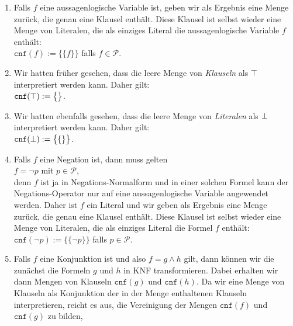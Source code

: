 \begin{enumerate}
\item Falls $f$ eine aussagenlogische Variable ist, geben wir als Ergebnis eine Menge zurück, die genau eine
      Klausel enthält.  Diese Klausel ist selbst wieder eine Menge von Literalen, die als einziges Literal die
      aussagenlogische Variable $f$ enthält:
      \\[0.2cm]
      \hspace*{1.3cm}
      $\texttt{cnf}(f) := \bigl\{\{f\}\bigr\}$ \quad falls $f \in \mathcal{P}$.
\item Wir hatten früher gesehen, dass die leere Menge von \emph{Klauseln} als $\top$ interpretiert werden kann.
      Daher gilt:
      \\[0.2cm]
      \hspace*{1.3cm}
      $\texttt{cnf}(\top) := \bigl\{\bigr\}$.      
\item Wir hatten ebenfalls gesehen, dass die leere Menge von \emph{Literalen} als $\bot$ interpretiert werden kann.
      Daher gilt:
      \\[0.2cm]
      \hspace*{1.3cm}
      $\texttt{cnf}(\bot) := \bigl\{\{\}\bigr\}$.      
\item Falls $f$ eine Negation ist, dann muss gelten
      \\[0.2cm]
      \hspace*{1.3cm}
      $f = \neg p$ \quad mit $p \in \mathcal{P}$,
      \\[0.2cm]
      denn $f$ ist ja in Negations-Normalform und in einer solchen Formel kann der Negations-Operator nur auf
      eine aussagenlogische Variable angewendet werden.  Daher ist $f$ ein Literal und wir geben als Ergebnis
      eine Menge zurück, die genau eine Klausel enthält.  Diese Klausel ist selbst wieder eine Menge von
      Literalen, die als einziges Literal die Formel $f$ enthält:
      \\[0.2cm]
      \hspace*{1.3cm}
      $\texttt{cnf}(\neg p) := \bigl\{\{\neg p\}\bigr\}$ \quad falls $p \in \mathcal{P}$.
\item Falls $f$ eine Konjunktion ist und also $f = g \wedge h$ gilt,  dann können wir die 
      zunächst die Formeln $g$ und $h$ in KNF transformieren.  Dabei erhalten wir dann Mengen von Klauseln 
      $\texttt{cnf}(g)$ und $\texttt{cnf}(h)$.  Da wir eine Menge von Klauseln als Konjunktion der in der Menge
      enthaltenen Klauseln interpretieren, reicht es aus,  
      die Vereinigung der Mengen $\texttt{cnf}(f)$ und $\texttt{cnf}(g)$ zu bilden,

\end{enumerate}

